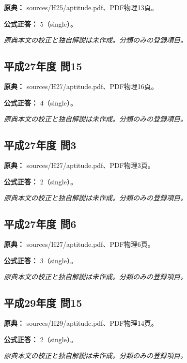 \noindent\textbf{原典：} sources/H25/aptitude.pdf、PDF物理13頁。

\textbf{公式正答：} 5（single）。

\par\textit{原典本文の校正と独自解説は未作成。分類のみの登録項目。}

\subsection{平成27年度 問15}
\label{q:h27-reg-apt-15}

\noindent\textbf{原典：} sources/H27/aptitude.pdf、PDF物理16頁。

\textbf{公式正答：} 4（single）。

\par\textit{原典本文の校正と独自解説は未作成。分類のみの登録項目。}

\subsection{平成27年度 問3}
\label{q:h27-reg-apt-03}

\noindent\textbf{原典：} sources/H27/aptitude.pdf、PDF物理3頁。

\textbf{公式正答：} 2（single）。

\par\textit{原典本文の校正と独自解説は未作成。分類のみの登録項目。}

\subsection{平成27年度 問6}
\label{q:h27-reg-apt-06}

\noindent\textbf{原典：} sources/H27/aptitude.pdf、PDF物理6頁。

\textbf{公式正答：} 3（single）。

\par\textit{原典本文の校正と独自解説は未作成。分類のみの登録項目。}

\subsection{平成29年度 問15}
\label{q:h29-reg-apt-15}

\noindent\textbf{原典：} sources/H29/aptitude.pdf、PDF物理14頁。

\textbf{公式正答：} 2（single）。

\par\textit{原典本文の校正と独自解説は未作成。分類のみの登録項目。}

